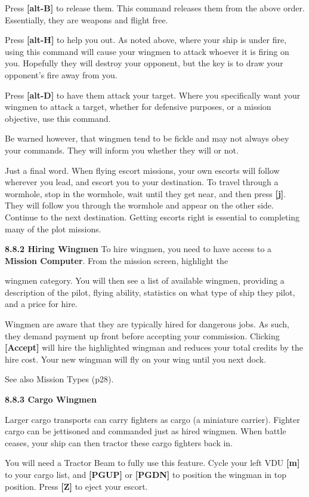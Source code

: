 \documentclass{article}
\begin{document}
Press \textbf{[alt-B] }to release them. This command releases them from the above order. Essentially, they are weapons and flight free. 

Press \textbf{[alt-H] }to help you out. As noted above, where your ship is under fire, using this command will cause your wingmen to attack whoever it is firing on you. Hopefully they will destroy your opponent, but the key is to draw your opponent's fire away from you. 

Press \textbf{[alt-D] }to have them attack your target. Where you specifically want your wingmen to attack a target, whether for defensive purposes, or a mission objective, use this command. 

Be warned however, that wingmen tend to be fickle and may not always obey your commands. They will inform you whether they will or not. 

Just a final word. When flying escort missions, your own escorts will follow wherever you lead, and escort you to your destination. To travel through a wormhole, stop in the wormhole, wait until they get near, and then press \textbf{[j]}. They will follow you through the wormhole and appear on the other side. Continue to the next destination. Getting escorts right is essential to completing many of the plot missions. 



\textbf{8.8.2 Hiring Wingmen }To hire wingmen, you need to have access to a \textbf{Mission Computer}. From the mission screen, highlight the 

wingmen category. You will then see a list of available wingmen, providing a description of the pilot, flying ability, statistics on what type of ship they pilot, and a price for hire. 

Wingmen are aware that they are typically hired for dangerous jobs. As such, they demand payment up front before accepting your commission. Clicking \textbf{[Accept] }will hire the highlighted wingman and reduces your total credits by the hire cost. Your new wingman will fly on your wing until you next dock. 

See also Mission Types (p28). 

\textbf{8.8.3 Cargo Wingmen }

Larger cargo transports can carry fighters as cargo (a miniature carrier). Fighter cargo can be jettisoned and commanded just as hired wingmen. When battle ceases, your ship can then tractor these cargo fighters back in. 

You will need a Tractor Beam to fully use this feature. Cycle your left VDU \textbf{[m] }to your cargo list, and \textbf{[PGUP]} or \textbf{[PGDN]} to position the wingman in top position.  Press \textbf{[Z]} to eject your escort. 
\end{document}
